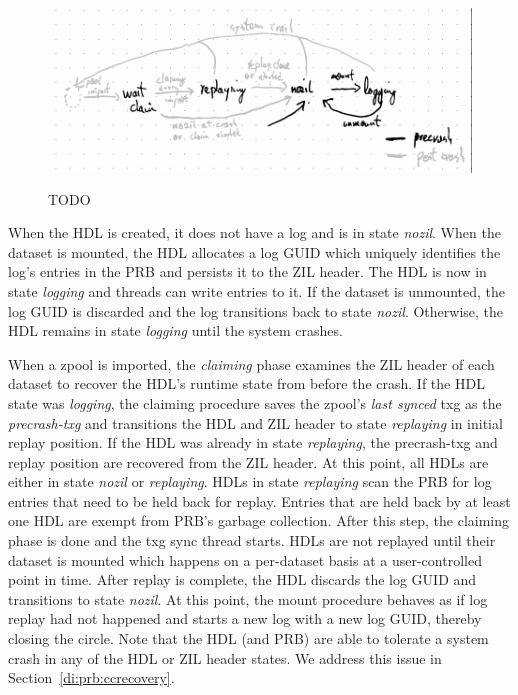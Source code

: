 \documentclass[12pt,a4paper,twoside]{book}
\begin{document}
\begin{figure}[H]
    \centering
    \includegraphics[height=5cm]{fig/prb_hdl_runtime_states}
    \caption{TODO}
\end{figure}

When the HDL is created, it does not have a log and is in state \textit{nozil}.
When the dataset is mounted, the HDL allocates a log GUID which uniquely identifies the log's entries in the PRB and persists it to the ZIL header.
The HDL is now in state \textit{logging} and threads can write entries to it.
If the dataset is unmounted, the log GUID is discarded and the log transitions back to state \textit{nozil}.
Otherwise, the HDL remains in state \textit{logging} until the system crashes.

When a zpool is imported, the \textit{claiming} phase examines the ZIL header of each dataset to recover the HDL's runtime state from before the crash.
If the HDL state was \textit{logging}, the claiming procedure saves the zpool's \textit{last synced} txg as the \textit{precrash-txg} and transitions the HDL and ZIL header to state \textit{replaying} in initial replay position.
If the HDL was already in state \textit{replaying}, the precrash-txg and replay position are recovered from the ZIL header.
At this point, all HDLs are either in state \textit{nozil} or \textit{replaying}.
HDLs in state \textit{replaying} scan the PRB for log entries that need to be held back for replay.
Entries that are held back by at least one HDL are exempt from PRB's garbage collection.
After this step, the claiming phase is done and the txg sync thread starts.
HDLs are not replayed until their dataset is mounted which happens on a per-dataset basis at a user-controlled point in time. %
After replay is complete, the HDL discards the log GUID and transitions to state \textit{nozil}.
At this point, the mount procedure behaves as if log replay had not happened and starts a new log with a new log GUID, thereby closing the circle.
Note that the HDL (and PRB) are able to tolerate a system crash in any of the HDL or ZIL header states.
We address this issue in Section~\ref{di:prb:ccrecovery}.
\end{document}
